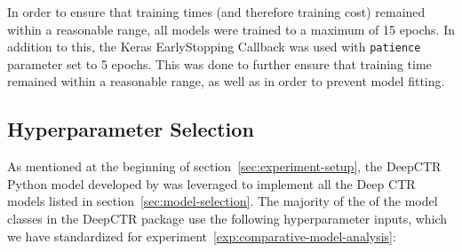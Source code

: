 \documentclass{mldsmsc}
\begin{document}
In order to ensure that training times (and therefore training cost)
remained within a reasonable range, all models were trained to a maximum of 15 epochs. In addition to this,
the Keras EarlyStopping Callback was used with \verb|patience| parameter set to 5 epochs. This was done to
further ensure that training time remained within a reasonable range, as well as in order to prevent
model fitting.


\subsection{Hyperparameter Selection}
\label{sec:hyperparameter-selection}

As mentioned at the beginning of section~\ref{sec:experiment-setup}, the DeepCTR Python model developed
by \cite{RefWorks:shen2017deepctr:} was leveraged to implement all the Deep CTR models listed in
section~\ref{sec:model-selection}. The majority of the of the model classes in the DeepCTR package
use the following hyperparameter inputs, which we have standardized for experiment~\ref{exp:comparative-model-analysis}:
\end{document}
